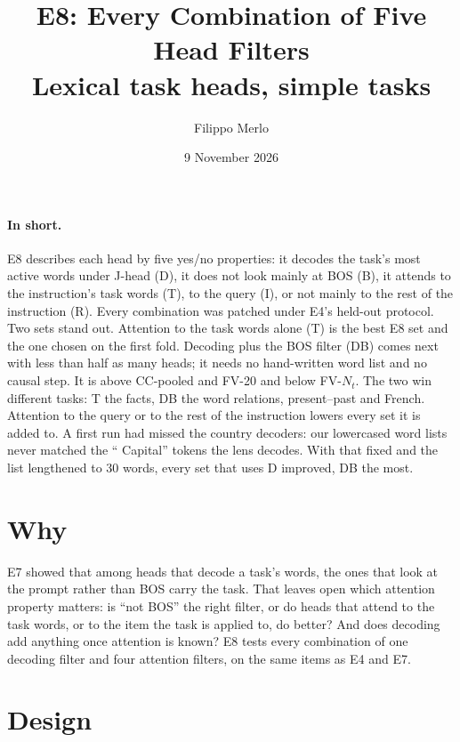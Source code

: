 \documentclass[10pt,a4paper]{article}
\title{E8: Every Combination of Five Head Filters\\\large Lexical task heads, simple tasks}
\author{Filippo Merlo}
\date{9 November 2026}
\begin{document}
\maketitle
\vspace{-1.5em}

\paragraph{In short.} E8 describes each head by five yes/no properties: it decodes the task's most active words under J-head (D), it does not look mainly at BOS (B), it attends to the instruction's task words (T), to the query (I), or not mainly to the rest of the instruction (R). Every combination was patched under E4's held-out protocol. Two sets stand out. Attention to the task words alone (T) is the best E8 set and the one chosen on the first fold. Decoding plus the BOS filter (DB) comes next with less than half as many heads; it needs no hand-written word list and no causal step. It is above CC-pooled and FV-20 and below FV-$N_t$. The two win different tasks: T the facts, DB the word relations, present--past and French. Attention to the query or to the rest of the instruction lowers every set it is added to. A first run had missed the country decoders: our lowercased word lists never matched the `` Capital'' tokens the lens decodes. With that fixed and the list lengthened to 30 words, every set that uses D improved, DB the most.

\section{Why}

E7 showed that among heads that decode a task's words, the ones that look at the prompt rather than BOS carry the task. That leaves open which attention property matters: is ``not BOS'' the right filter, or do heads that attend to the task words, or to the item the task is applied to, do better? And does decoding add anything once attention is known? E8 tests every combination of one decoding filter and four attention filters, on the same items as E4 and E7.

\section{Design}
\end{document}

